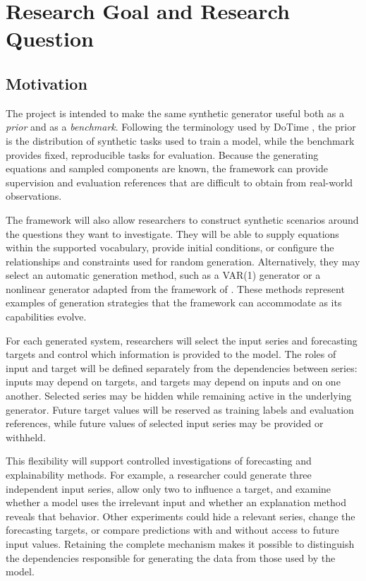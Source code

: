 \section{Research Goal and Research Question}

\subsection*{Motivation}

The project is intended to make the same synthetic generator useful both as a
\emph{prior} and as a \emph{benchmark}. Following the terminology used by
DoTime \citep{thumm2026dotime}, the prior is the distribution of synthetic
tasks used to train a model, while the benchmark provides fixed, reproducible
tasks for evaluation. Because the generating equations and sampled components
are known, the framework can provide supervision and evaluation references
that are difficult to obtain from real-world observations.

The framework will also allow researchers to construct synthetic scenarios
around the questions they want to investigate. They will be able to supply
equations within the supported vocabulary, provide initial conditions, or
configure the relationships and constraints used for random generation.
Alternatively, they may select an automatic generation method, such as a
VAR(1) generator or a nonlinear generator adapted from the framework of
\citet{shao2007spectral}. These methods represent examples of generation
strategies that the framework can accommodate as its capabilities evolve.

For each generated system, researchers will select the input series and
forecasting targets and control which information is provided to the model.
The roles of input and target will be defined separately from the dependencies
between series: inputs may depend on targets, and targets may depend on inputs
and on one another. Selected series may be hidden while remaining active in
the underlying generator. Future target values will be reserved as training
labels and evaluation references, while future values of selected input series
may be provided or withheld.

This flexibility will support controlled investigations of forecasting and
explainability methods. For example, a researcher could generate three
independent input series, allow only two to influence a target, and examine
whether a model uses the irrelevant input and whether an explanation method
reveals that behavior. Other experiments could hide a relevant series, change
the forecasting targets, or compare predictions with and without access to
future input values. Retaining the complete mechanism makes it possible to
distinguish the dependencies responsible for generating the data from those
used by the model.


